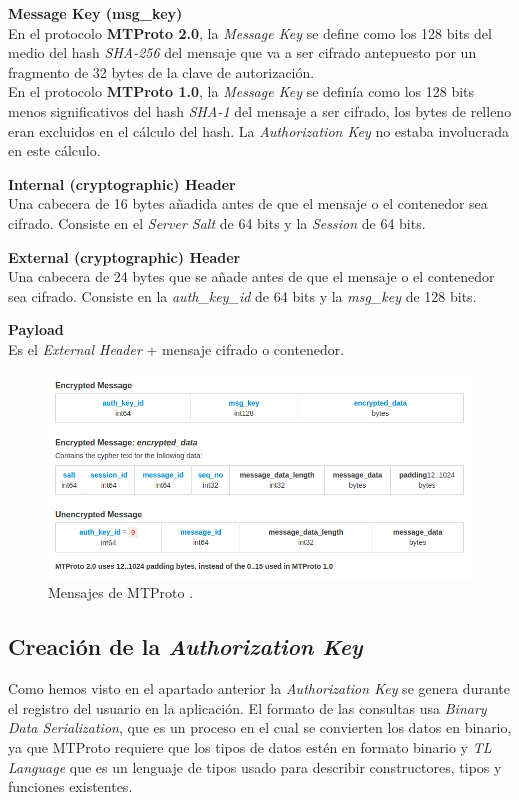 \begin{description}
	\item \textbf{Message Key (msg\_key)}\\
	En el protocolo \textbf{MTProto 2.0}, la \emph{Message Key} se define como los 128 bits del medio del hash \emph{SHA-256} del mensaje que va a ser cifrado antepuesto por un fragmento de 32 bytes de la clave de autorización.\\
	En el protocolo \textbf{MTProto 1.0}, la \emph{Message Key} se definía como los 128 bits menos significativos del hash \emph{SHA-1} del mensaje a ser cifrado, los bytes de relleno eran excluidos en el cálculo del hash. La \emph{Authorization Key} no estaba involucrada en este cálculo.

	\item \textbf{Internal (cryptographic) Header}\\
	Una cabecera de 16 bytes añadida antes de que el mensaje o el contenedor sea cifrado. Consiste en el \emph{Server Salt} de 64 bits y la \emph{Session} de 64 bits.

	\item \textbf{External (cryptographic) Header}\\
	Una cabecera de 24 bytes que se añade antes de que el mensaje o el contenedor sea cifrado. Consiste en la \emph{auth\_key\_id} de 64 bits y la \emph{msg\_key} de 128 bits.

	\item \textbf{Payload}\\
	Es el \emph{External Header} + mensaje cifrado o contenedor.
\end{description}

\begin{figure}[htb]
	\centering
	\includegraphics[scale=0.45]{imagenes/MTProto2.png} 
	\caption{Mensajes de MTProto \cite{WebProto}.}
	\label{mtproto1}
\end{figure}

\subsection{Creación de la \emph{Authorization Key}}
Como hemos visto en el apartado anterior la \emph{Authorization Key} se genera durante el registro del usuario en la aplicación. El formato de las consultas usa \emph{Binary Data Serialization}, que es un proceso en el cual se convierten los datos en binario, ya que MTProto requiere que los tipos de datos estén en formato binario y \emph{TL Language} que es un lenguaje de tipos usado para describir constructores, tipos y funciones existentes.

